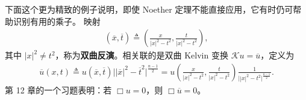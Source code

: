 \documentclass[../../main.tex]{subfiles}
\begin{document}
\begin{example}[波方程的共形能量]\label{example:ch08-6-5-共形能量}
下面这个更为精致的例子说明，即使 Noether 定理不能直接应用，它有时仍可帮助识别有用的乘子。
映射
\begin{align}
(\overline{x},\overline{t})\triangleq\left(\frac{x}{|x|^2-t^2},\frac{t}{|x|^2-t^2}\right),\label{align:ch08-6-eq15}
\end{align}
其中 $|x|^2\neq t^2$，称为\textbf{双曲反演}。相关联的是双曲 Kelvin 变换 $\mathcal{K}u=\overline{u}$，定义为
\begin{align}
\overline{u}(x,t)\triangleq u(\overline{x},\overline{t})\big||\overline{x}|^2-\overline{t}^2\big|^{\frac{n-1}{2}}=u\!\left(\frac{x}{|x|^2-t^2},\frac{t}{|x|^2-t^2}\right)\frac1{\big||x|^2-t^2\big|^{\frac{n-1}{2}}}.\label{align:ch08-6-eq16}
\end{align}
第 12 章的一个习题表明：若 $\Box u=0$，则 $\Box\overline{u}=0$。


\end{example}
\end{document}
